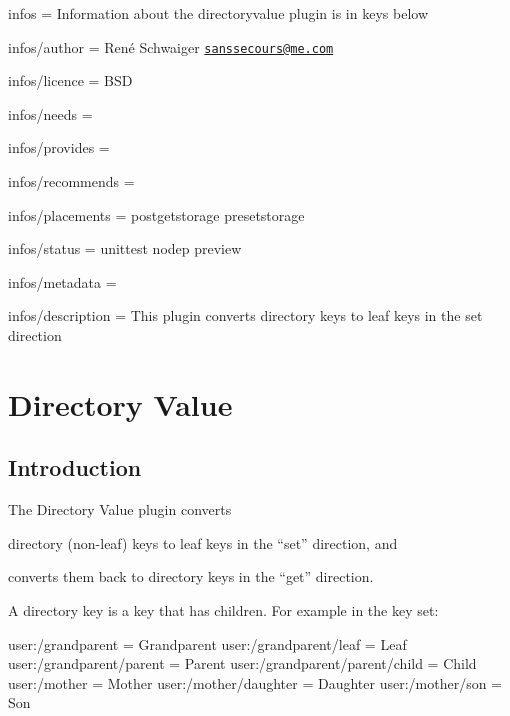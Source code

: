 
\begin{DoxyItemize}
\item infos = Information about the directoryvalue plugin is in keys below
\item infos/author = René Schwaiger \href{mailto:sanssecours@me.com}{\tt sanssecours@me.\+com}
\item infos/licence = B\+SD
\item infos/needs =
\item infos/provides =
\item infos/recommends =
\item infos/placements = postgetstorage presetstorage
\item infos/status = unittest nodep preview
\item infos/metadata =
\item infos/description = This plugin converts directory keys to leaf keys in the set direction
\end{DoxyItemize}\hypertarget{autotoc_md173_src_plugins_directoryvalue_README_md}{}\section{Directory Value}\label{autotoc_md173_src_plugins_directoryvalue_README_md}
\hypertarget{autotoc_md173_autotoc_md174}{}\subsection{Introduction}\label{autotoc_md173_autotoc_md174}
The Directory Value plugin converts


\begin{DoxyEnumerate}
\item directory (non-\/leaf) keys to leaf keys in the “set” direction, and
\item converts them back to directory keys in the “get” direction.
\end{DoxyEnumerate}

A directory key is a key that has children. For example in the key set\+:


\begin{DoxyCode}
user:/grandparent                = Grandparent
user:/grandparent/leaf           = Leaf
user:/grandparent/parent         = Parent
user:/grandparent/parent/child   = Child
user:/mother                     = Mother
user:/mother/daughter            = Daughter
user:/mother/son                 = Son
\end{DoxyCode}


